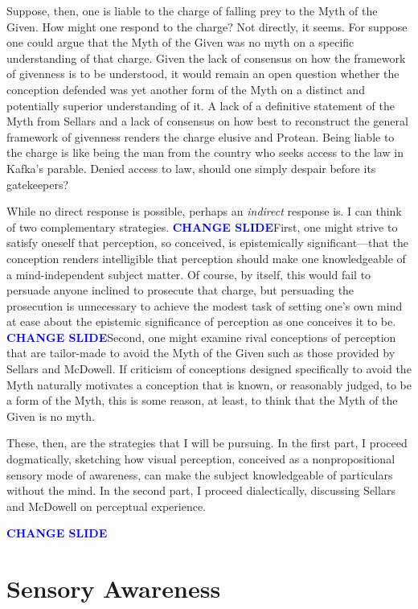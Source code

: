 \documentclass[12pt]{article}
\newcommand{\change}{\textcolor{blue}{\textbf{CHANGE SLIDE}}}
\begin{document}
Suppose, then, one is liable to the charge of falling prey to the Myth of the Given. How might one respond to the charge? Not directly, it seems. For suppose one could argue that the Myth of the Given was no myth on a specific understanding of that charge. Given the lack of consensus on how the framework of givenness is to be understood, it would remain an open question whether the conception defended was yet another form of the Myth on a distinct and potentially superior understanding of it. A lack of a definitive statement of the Myth from Sellars and a lack of consensus on how best to reconstruct the general framework of givenness renders the charge elusive and Protean. Being liable to the charge is like being the man from the country who seeks access to the law in Kafka's parable. Denied access to law, should one simply despair before its gatekeepers?

While no direct response is possible, perhaps an \emph{indirect} response is. I can think of two complementary strategies. \change First, one might strive to satisfy oneself that perception, so conceived, is epistemically significant---that the conception renders intelligible that perception should make one knowledgeable of a mind-independent subject matter. Of course, by itself, this would fail to persuade anyone inclined to prosecute that charge, but persuading the prosecution is unnecessary to achieve the modest task of setting one's own mind at ease about the epistemic significance of perception as one conceives it to be. \change Second, one might examine rival conceptions of perception that are tailor-made to avoid the Myth of the Given such as those provided by Sellars and McDowell. If criticism of conceptions designed specifically to avoid the Myth naturally motivates a conception that is known, or reasonably judged, to be a form of the Myth, this is some reason, at least, to think that the Myth of the Given is no myth. 

These, then, are the strategies that I will be pursuing. In the first part, I proceed dogmatically, sketching how visual perception, conceived as a nonpropositional sensory mode of awareness, can make the subject knowledgeable of particulars without the mind. In the second part, I proceed dialectically, discussing Sellars and McDowell on perceptual experience.

\change


\section{Sensory Awareness} %
\label{sec:sensory_awareness}
\end{document}
